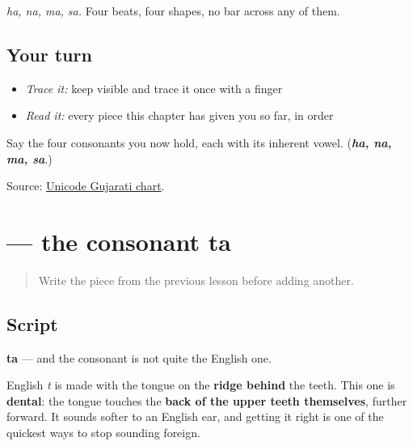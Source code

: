 \emph{ha, na, ma, sa.} Four beats, four shapes, no bar across any of them.

\subsection*{Your turn}
\begin{itemize}
\raggedright
  \item \emph{Trace it:} keep  visible and trace it once with a finger
  \item \emph{Read it:} every piece this chapter has given you so far, in order
\end{itemize}

\begin{tcolorbox}[breakable,colback=teal!4,colframe=teal!35!black,title={Before you move on}]
Say the four consonants you now hold, each with its inherent vowel. (\emph{\textbf{ha, na, ma, sa}}.)

Source: \href{https://www.unicode.org/charts/PDF/U0A80.pdf}{Unicode Gujarati chart}.
\end{tcolorbox}
\section[\texorpdfstring{\gu{ત} (ta)}{ત (ta)}]{ — the consonant ta}

\label{lesson:GU-W01-ta}



\begin{quote}
Write the piece from the previous lesson before adding another.
\end{quote}

\subsection*{Script}

\begin{quote}
\end{quote}

\textbf{ta} — and the consonant is not quite the English one.

English \emph{t} is made with the tongue on the \textbf{ridge behind} the teeth. This one is \textbf{dental}: the tongue touches the \textbf{back of the upper teeth themselves}, further forward. It sounds softer to an English ear, and getting it right is one of the quickest ways to stop sounding foreign.

